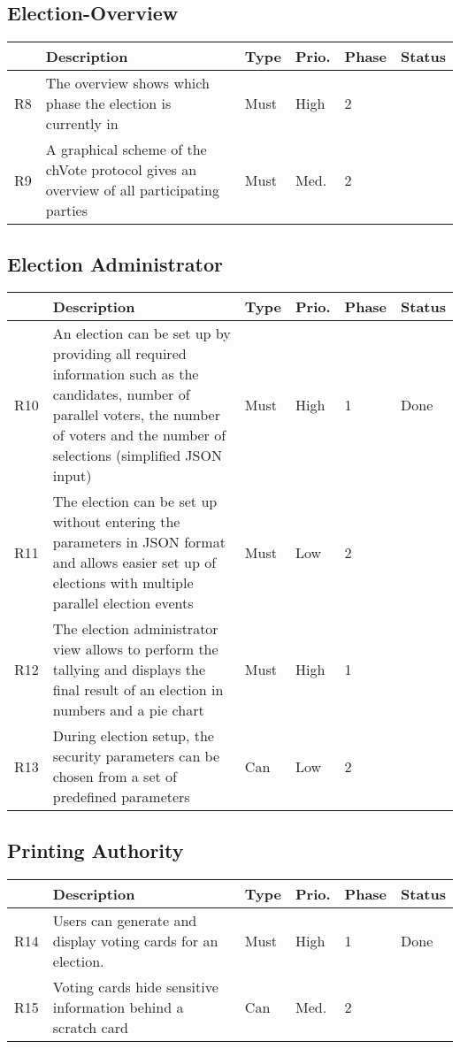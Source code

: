 \subsection{Election-Overview}
\begin{longtable}{p{0.5cm}p{9cm}p{1cm}p{1cm}p{1cm}p{1cm}}
\hline
 & Description & Type & Prio. & Phase & Status\\
\hline
R8 & The overview shows which phase the election is currently in & Must & High & 2 & \\
R9 & A graphical scheme of the chVote protocol gives an overview of all participating parties & Must & Med. & 2 & \\
\end{longtable}

\subsection{Election Administrator}
\begin{longtable}{p{0.5cm}p{9cm}p{1cm}p{1cm}p{1cm}p{1cm}}
\hline
 & Description & Type & Prio. & Phase & Status\\
\hline
R10 & An election can be set up by providing all required information such as the candidates, number of parallel voters, the number of voters and the number of selections (simplified JSON input) & Must & High & 1 & Done\\
R11 & The election can be set up without entering the parameters in JSON format and allows easier set up of elections with multiple parallel election events & Must & Low & 2 & \\
R12 & The election administrator view allows to perform the tallying and displays the final result of an election in numbers and a pie chart & Must & High & 1 & \\
R13 &  During election setup, the security parameters can be chosen from a set of predefined parameters & Can & Low & 2 & \\
\end{longtable}

\subsection{Printing Authority}
\begin{longtable}{p{0.5cm}p{9cm}p{1cm}p{1cm}p{1cm}p{1cm}}
\hline
 & Description & Type & Prio. & Phase & Status\\
\hline
R14 & Users can generate and display voting cards for an election. & Must & High & 1 & Done\\
R15 & Voting cards hide sensitive information behind a scratch card & Can & Med. & 2 & \\
\end{longtable}

